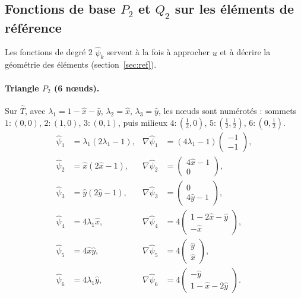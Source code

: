\documentclass[11pt,a4paper]{article}
\begin{document}
\subsection{Fonctions de base $P_2$ et $Q_2$ sur les éléments de référence}
\label{sec:bases}

Les fonctions de degré 2 $\widehat{\psi}_k$ servent à la fois à approcher
$u$ et à décrire la géométrie des éléments (section~\ref{sec:ref}).

\paragraph{Triangle $P_2$ (6 nœuds).} Sur $\widehat{T}$, avec
$\lambda_1 = 1 - \hat{x} - \hat{y}$, $\lambda_2 = \hat{x}$,
$\lambda_3 = \hat{y}$, les nœuds sont numérotés : sommets $1{:}(0,0)$,
$2{:}(1,0)$, $3{:}(0,1)$, puis milieux $4{:}(\tfrac12,0)$,
$5{:}(\tfrac12,\tfrac12)$, $6{:}(0,\tfrac12)$.
\[
\begin{aligned}
\widehat{\psi}_1 &= \lambda_1(2\lambda_1 - 1), &
\nabla\widehat{\psi}_1 &= (4\lambda_1 - 1)\begin{pmatrix} -1 \\ -1 \end{pmatrix}, \\
\widehat{\psi}_2 &= \hat{x}(2\hat{x} - 1), &
\nabla\widehat{\psi}_2 &= \begin{pmatrix} 4\hat{x} - 1 \\ 0 \end{pmatrix}, \\
\widehat{\psi}_3 &= \hat{y}(2\hat{y} - 1), &
\nabla\widehat{\psi}_3 &= \begin{pmatrix} 0 \\ 4\hat{y} - 1 \end{pmatrix}, \\
\widehat{\psi}_4 &= 4\lambda_1\hat{x}, &
\nabla\widehat{\psi}_4 &= 4\begin{pmatrix} 1 - 2\hat{x} - \hat{y} \\ -\hat{x} \end{pmatrix}, \\
\widehat{\psi}_5 &= 4\hat{x}\hat{y}, &
\nabla\widehat{\psi}_5 &= 4\begin{pmatrix} \hat{y} \\ \hat{x} \end{pmatrix}, \\
\widehat{\psi}_6 &= 4\lambda_1\hat{y}, &
\nabla\widehat{\psi}_6 &= 4\begin{pmatrix} -\hat{y} \\ 1 - \hat{x} - 2\hat{y} \end{pmatrix}.
\end{aligned}
\]
\end{document}

